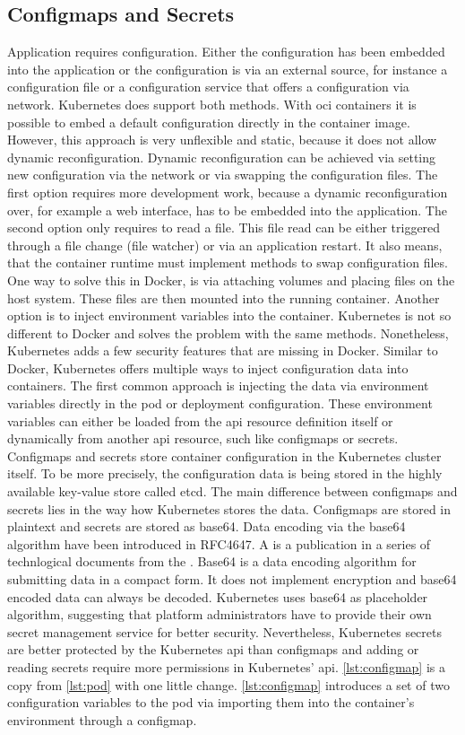 \documentclass[titlepage]{report}
\begin{document}
\subsection{Configmaps and Secrets}
Application requires configuration. Either the configuration has been embedded into the application or the configuration is via an external source, for instance a configuration file or a configuration service that offers a configuration via network.
Kubernetes does support both methods. With \gls{oci} containers it is possible to embed a default configuration directly in the container image. However, this approach is very unflexible and static, because it does not allow dynamic reconfiguration.
Dynamic reconfiguration can be achieved via setting new configuration via the network or via swapping the configuration files. The first option requires more development work, because a dynamic reconfiguration over, for example a web interface,
has to be embedded into the application. The second option only requires to read a file. This file read can be either triggered through a file change (file watcher) or via an application restart. It also means, that the container runtime must
implement methods to swap configuration files. One way to solve this in Docker, is via attaching volumes and placing files on the host system. These files are then mounted into the running container. Another option is to inject environment variables
into the container. Kubernetes is not so different to Docker and solves the problem with the same methods. Nonetheless, Kubernetes adds a few security features that are missing in Docker. Similar to Docker, Kubernetes offers multiple ways to inject
configuration data into containers. The first common approach is injecting the data via environment variables directly in the pod or deployment configuration. These environment variables can either be loaded from the \gls{api} resource definition itself
or dynamically from another \gls{api} resource, such like configmaps or secrets. Configmaps and secrets store container configuration in the Kubernetes cluster itself. To be more precisely, the configuration data is being stored in the highly available
key-value store called etcd. The main difference between configmaps and secrets lies in the way how Kubernetes stores the data. Configmaps are stored in plaintext and secrets are stored as base64. Data encoding via the base64 algorithm have been introduced
in RFC4647\cite{RFC4648}. A  is a publication in a series of technlogical documents from the \cite{WikipediaRFC}. Base64 is a data encoding algorithm for submitting data in a compact form. It does not implement encryption and
base64 encoded data can always be decoded. Kubernetes uses base64 as placeholder algorithm, suggesting that platform administrators have to provide their own secret management service for better security. Nevertheless, Kubernetes secrets are better protected
by the Kubernetes \gls{api} than configmaps and adding or reading secrets require more permissions in Kubernetes' \gls{api}. \autoref{lst:configmap} is a copy from \autoref{lst:pod} with one little change. \autoref{lst:configmap} introduces
a set of two configuration variables to the pod via importing them into the container's environment through a configmap. 
\end{document}

